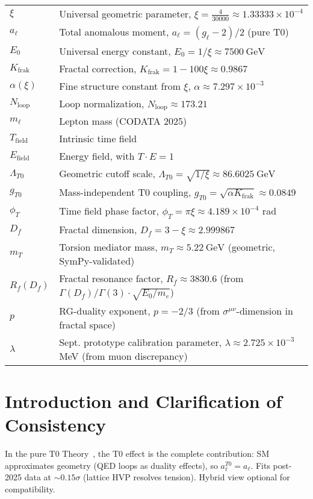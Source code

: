 \documentclass[12pt,a4paper]{article}
\theoremstyle{definition}
\begin{document}
	\begin{tabular}{ll}
		$\xi$ & Universal geometric parameter, $\xi = \frac{4}{30000} \approx 1.33333 \times 10^{-4}$ \\
		$a_\ell$ & Total anomalous moment, $a_\ell = (g_\ell - 2)/2$ (pure T0) \\
		$E_0$ & Universal energy constant, $E_0 = 1/\xi \approx \SI{7500}{\giga\electronvolt}$ \\
		$K_{\text{frak}}$ & Fractal correction, $K_{\text{frak}} = 1 - 100 \xi \approx 0.9867$ \\
		$\alpha(\xi)$ & Fine structure constant from $\xi$, $\alpha \approx 7.297 \times 10^{-3}$ \\
		$N_{\text{loop}}$ & Loop normalization, $N_{\text{loop}} \approx 173.21$ \\
		$m_\ell$ & Lepton mass (CODATA 2025) \\
		$T_{\text{field}}$ & Intrinsic time field \\
		$E_{\text{field}}$ & Energy field, with $T \cdot E = 1$ \\
		$\Lambda_{T0}$ & Geometric cutoff scale, $\Lambda_{T0} = \sqrt{1/\xi} \approx \SI{86.6025}{\giga\electronvolt}$ \\
		$g_{T0}$ & Mass-independent T0 coupling, $g_{T0} = \sqrt{\alpha K_{\text{frak}}} \approx 0.0849$ \\
		$\phi_T$ & Time field phase factor, $\phi_T = \pi \xi \approx 4.189 \times 10^{-4}$ rad \\
		$D_f$ & Fractal dimension, $D_f = 3 - \xi \approx 2.999867$ \\
		$m_T$ & Torsion mediator mass, $m_T \approx \SI{5.22}{\giga\electronvolt}$ (geometric, SymPy-validated) \\
		$R_f(D_f)$ & Fractal resonance factor, $R_f \approx 3830.6$ (from $\Gamma(D_f)/\Gamma(3) \cdot \sqrt{E_0/m_e}$) \\
		$p$ & RG-duality exponent, $p = -2/3$ (from $\sigma^{\mu\nu}$-dimension in fractal space) \\
		$\lambda$ & Sept. prototype calibration parameter, $\lambda \approx 2.725 \times 10^{-3}$ MeV (from muon discrepancy) \\
	\end{tabular}
	
	\section{Introduction and Clarification of Consistency}
	In the pure T0 Theory~\cite{T0_SI}, the T0 effect is the complete contribution: SM approximates geometry (QED loops as duality effects), so $a_\ell^{T0} = a_\ell$. Fits post-2025 data at $\sim 0.15\sigma$ (lattice HVP resolves tension). Hybrid view optional for compatibility.
	
\end{document}
